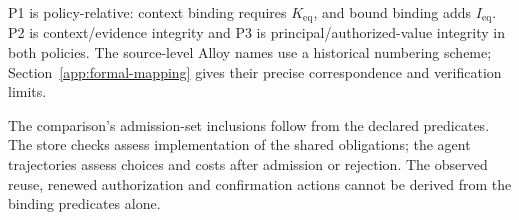 P1 is policy-relative: context binding requires $K_{\mathrm{eq}}$, and bound
binding adds $I_{\mathrm{eq}}$. P2 is context/evidence integrity and P3 is
principal/authorized-value integrity in both policies. The source-level Alloy
names use a historical numbering scheme; Section~\ref{app:formal-mapping}
gives their precise correspondence and verification limits.

The comparison's admission-set inclusions follow from the declared predicates.
The store checks assess implementation of the shared obligations; the agent
trajectories assess choices and costs after admission or rejection. The
observed reuse, renewed authorization and confirmation actions cannot be
derived from the binding predicates alone.
